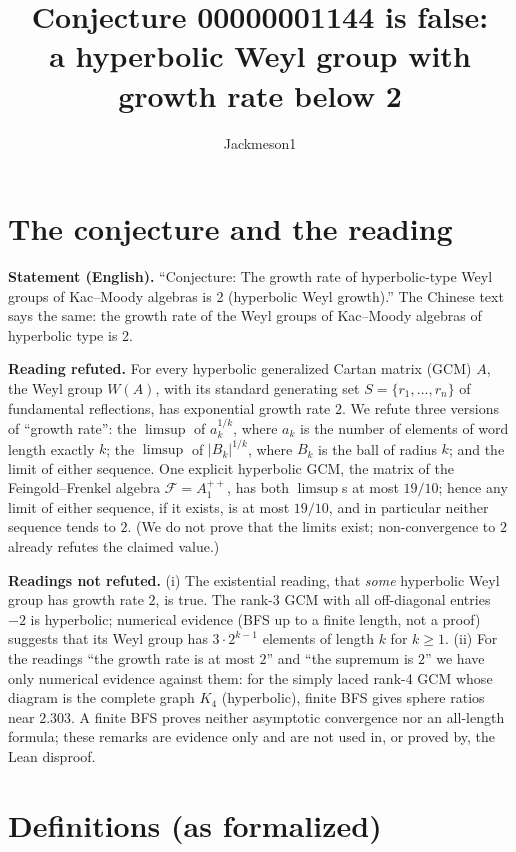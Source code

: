 \documentclass[11pt]{article}
\title{Conjecture 00000001144 is false:\\ a hyperbolic Weyl group with growth rate below 2}
\author{Jackmeson1}
\date{}
\theoremstyle{definition}
\begin{document}
\maketitle

\section{The conjecture and the reading}

\textbf{Statement (English).} ``Conjecture: The growth rate of hyperbolic-type Weyl groups of
Kac--Moody algebras is 2 (hyperbolic Weyl growth).'' The Chinese text says the same: the growth
rate of the Weyl groups of Kac--Moody algebras of hyperbolic type is 2.

\textbf{Reading refuted.} For every hyperbolic generalized Cartan matrix (GCM) $A$, the Weyl
group $W(A)$, with its standard generating set $S=\{r_1,\dots,r_n\}$ of fundamental
reflections, has exponential growth rate $2$. We refute three versions of ``growth rate'': the
$\limsup$ of $a_k^{1/k}$, where $a_k$ is the number of elements of word length exactly $k$; the
$\limsup$ of $|B_k|^{1/k}$, where $B_k$ is the ball of radius $k$; and the limit of either
sequence. One explicit hyperbolic GCM, the matrix of the Feingold--Frenkel algebra
$\mathcal F=A_1^{++}$, has both $\limsup$s at most $19/10$; hence any limit of either sequence,
if it exists, is at most $19/10$, and in particular neither sequence tends to $2$. (We do not
prove that the limits exist; non-convergence to $2$ already refutes the claimed value.)

\textbf{Readings not refuted.} (i) The existential reading, that \emph{some} hyperbolic Weyl
group has growth rate $2$, is true. The rank-3 GCM with all off-diagonal entries $-2$ is
hyperbolic; numerical evidence (BFS up to a finite length, not a proof) suggests that its
Weyl group has $3\cdot 2^{k-1}$ elements of length $k$ for $k\ge 1$. (ii) For the readings ``the
growth rate is at most $2$'' and ``the supremum is $2$'' we have only numerical evidence against
them: for the simply laced rank-4 GCM whose diagram is the complete graph $K_4$ (hyperbolic),
finite BFS gives sphere ratios near $2.303$. A finite BFS proves neither asymptotic convergence
nor an all-length formula; these remarks are evidence only and are not used in, or proved by,
the Lean disproof.

\section{Definitions (as formalized)}
\end{document}

